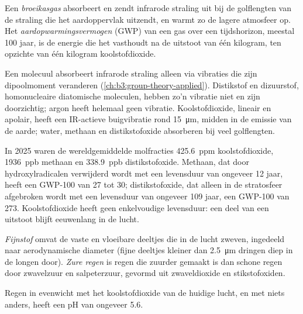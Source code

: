 \begin{definition}[Broeikasgassen]\label{def:b3:environmental-toxicology:greenhouse}
Een \emph{broeikasgas} absorbeert en zendt infrarode
straling uit bij de golflengten van de straling die het aardoppervlak
uitzendt, en warmt zo de lagere atmosfeer op. Het
\emph{aardopwarmingsvermogen} (GWP) van
een gas over een tijdshorizon, meestal 100 jaar, is de energie die het
vasthoudt na de uitstoot van één kilogram, ten opzichte van één kilogram
koolstofdioxide.
\end{definition}

Een molecuul absorbeert infrarode straling alleen via vibraties die zijn
dipoolmoment veranderen (\cref{ch:b3:group-theory-applied}). Distikstof
en dizuurstof, homonucleaire diatomische moleculen, hebben zo'n vibratie
niet en zijn doorzichtig; argon heeft helemaal geen vibratie.
Koolstofdioxide, lineair en apolair, heeft een IR-actieve buigvibratie
rond \qty{15}{\micro\metre}, midden in de emissie van de aarde; water,
methaan en distikstofoxide absorberen bij veel golflengten.

In 2025 waren de wereldgemiddelde molfracties \qty{425.6}{ppm} koolstofdioxide, \qty{1936}{ppb}
methaan en \qty{338.9}{ppb} distikstofoxide. Methaan, dat door hydroxylradicalen
verwijderd wordt met een levensduur van ongeveer 12 jaar, heeft een
GWP-100 van 27 tot 30; distikstofoxide, dat alleen in de stratosfeer
afgebroken wordt met een levensduur van ongeveer 109 jaar, een GWP-100
van 273. Koolstofdioxide heeft geen
enkelvoudige levensduur: een deel van een uitstoot blijft eeuwenlang in
de lucht.

\begin{definition}\label{def:b3:environmental-toxicology:pollutants}
\emph{Fijnstof} omvat de vaste en vloeibare deeltjes die
in de lucht zweven, ingedeeld naar aerodynamische diameter (fijne
deeltjes kleiner dan \qty{2.5}{\micro\metre} dringen diep in de longen
door). \emph{Zure regen} is regen die zuurder gemaakt
is dan schone regen door zwavelzuur en salpeterzuur, gevormd uit
zwaveldioxide en stikstofoxiden.
\end{definition}

\begin{proposition}\label{prop:b3:environmental-toxicology:rain-ph}
Regen in evenwicht met het koolstofdioxide van de huidige lucht, en met
niets anders, heeft een pH van ongeveer 5.6.
\end{proposition}


